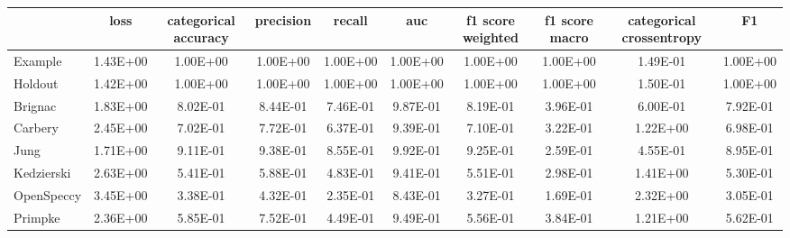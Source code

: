 \begin{tabular}{lccccccccc}
\toprule
 & loss & categorical accuracy & precision & recall & auc & f1 score weighted & f1 score macro & categorical crossentropy & F1 \\
\midrule
Example & 1.43E+00 & 1.00E+00 & 1.00E+00 & 1.00E+00 & 1.00E+00 & 1.00E+00 & 1.00E+00 & 1.49E-01 & 1.00E+00 \\
Holdout & 1.42E+00 & 1.00E+00 & 1.00E+00 & 1.00E+00 & 1.00E+00 & 1.00E+00 & 1.00E+00 & 1.50E-01 & 1.00E+00 \\
Brignac & 1.83E+00 & 8.02E-01 & 8.44E-01 & 7.46E-01 & 9.87E-01 & 8.19E-01 & 3.96E-01 & 6.00E-01 & 7.92E-01 \\
Carbery & 2.45E+00 & 7.02E-01 & 7.72E-01 & 6.37E-01 & 9.39E-01 & 7.10E-01 & 3.22E-01 & 1.22E+00 & 6.98E-01 \\
Jung & 1.71E+00 & 9.11E-01 & 9.38E-01 & 8.55E-01 & 9.92E-01 & 9.25E-01 & 2.59E-01 & 4.55E-01 & 8.95E-01 \\
Kedzierski & 2.63E+00 & 5.41E-01 & 5.88E-01 & 4.83E-01 & 9.41E-01 & 5.51E-01 & 2.98E-01 & 1.41E+00 & 5.30E-01 \\
OpenSpeccy & 3.45E+00 & 3.38E-01 & 4.32E-01 & 2.35E-01 & 8.43E-01 & 3.27E-01 & 1.69E-01 & 2.32E+00 & 3.05E-01 \\
Primpke & 2.36E+00 & 5.85E-01 & 7.52E-01 & 4.49E-01 & 9.49E-01 & 5.56E-01 & 3.84E-01 & 1.21E+00 & 5.62E-01 \\
\bottomrule
\end{tabular}
